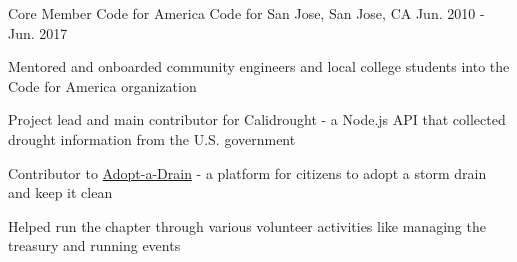 

\begin{cventries}

  \cventry
    {Core Member} %
    {Code for America} %
    {Code for San Jose, San Jose, CA} %
    {Jun. 2010 - Jun. 2017} %
    {
      \begin{cvitems} %
        \item {Mentored and onboarded community engineers and local college students into the Code for America organization}
        \item {Project lead and main contributor for Calidrought - a Node.js API that collected drought information from the U.S. government}
        \item {Contributor to \href{https://github.com/sfbrigade/adopt-a-drain}{Adopt-a-Drain} - a platform for citizens to adopt a storm drain and keep it clean}
        \item {Helped run the chapter through various volunteer activities like managing the treasury and running events}
      \end{cvitems}
    }
\end{cventries}
